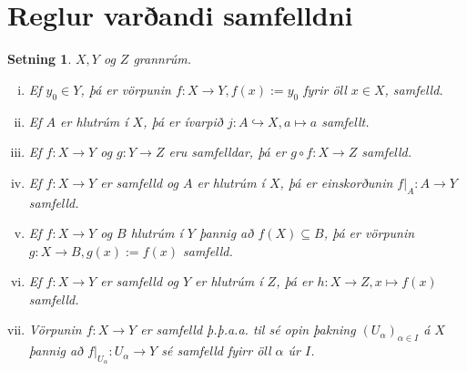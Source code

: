\documentclass[a4paper,icelandic]{book}
\theoremstyle{definition}
\theoremstyle{plain}
\newtheorem{setn}{Setning}[section]
\theoremstyle{remark}
\begin{document}
\section{Reglur varðandi samfelldni}
\begin{setn}
  $X,Y$ og $Z$ grannrúm.
  \begin{enumerate}[(i)]
    \item Ef $y_0\in Y$, þá er vörpunin $f:X\to Y, f(x):=y_0$ fyrir öll $x\in
      X$, samfelld.
    \item Ef $A$ er hlutrúm í $X$, þá er ívarpið $j:A\hookrightarrow X, a\mapsto
      a$ samfellt.
    \item Ef $f:X\to Y$ og $g:Y\to Z$ eru samfelldar, þá er $g\circ f:X\to Z$
      samfelld. 
    \item Ef $f:X\to Y$ er samfelld og $A$ er hlutrúm í $X$, þá er einskorðunin
      $f|_A:A\to Y$ samfelld.
    \item Ef $f:X\to Y$ og $B$ hlutrúm í $Y$ þannig að $f(X)\subseteq B$, þá er
      vörpunin $g:X\to B, g(x) := f(x)$ samfelld.
    \item[(v')] Ef $f:X\to Y$ er samfelld og $Y$ er hlutrúm í $Z$, þá er
      $h:X\to Z, x\mapsto f(x)$ samfelld.
    \item  Vörpunin $f:X\to Y$ er samfelld \emph{þ.þ.a.a.} til sé opin þakning
      $(U_\alpha)_{\alpha\in I}$ á $X$ þannig að $f|_{U_\alpha}:U_\alpha\to Y$
      sé samfelld fyirr öll $\alpha$ úr $I$.
  \end{enumerate}
\end{setn}
\end{document}
